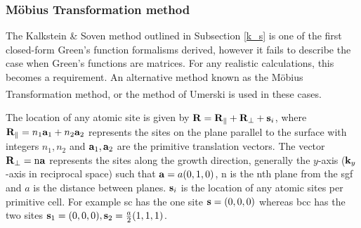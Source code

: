 \documentclass[a4paper, 12pt]{article}
\begin{document}
	\subsubsection{M\"{o}bius Transformation method}
	The Kalkstein \& Soven method outlined in Subsection \ref{k_s} is one of the first closed-form Green's function formalisms derived, however it fails to describe the case when Green's functions are matrices. For any realistic calculations, this becomes a requirement. 
An alternative method known as the M\"{o}bius Transformation method, or the method of Umerski\textcolor{blue}{\textsuperscript{\cite{AU_SGF}}} is used in these cases.
\\\par The location of any atomic site is given by ${\bf R} = {\bf R}_\parallel + {\bf R}_\perp +{\bf s}_i$, where ${\bf R}_\parallel = n_1{\bf a}_1+n_2{\bf a}_2$ represents the sites on the plane parallel to the surface with integers $n_1,n_2$ and ${\bf a}_1,{\bf a}_2$ are the primitive translation vectors. The vector ${\bf R}_\perp = \rm n\bf a$ represents the sites along the growth direction, generally the $y$-axis (${\bf k}_y$-axis in reciprocal space) such that ${\bf a} = a(0,1,0)$, n is the nth plane from the \gls{sgf} and $a$ is the distance between planes.
${\bf s}_i$ is the location of any atomic sites per primitive cell. For example \gls{sc} has the one site ${\bf s} = (0,0,0)$ whereas \gls{bcc} has the two sites ${\bf s}_1 = (0,0,0), 	{\bf s}_2 = \frac{a}{2}(1,1,1)$.
	\tikzset{external/export next=false}
\end{document}
